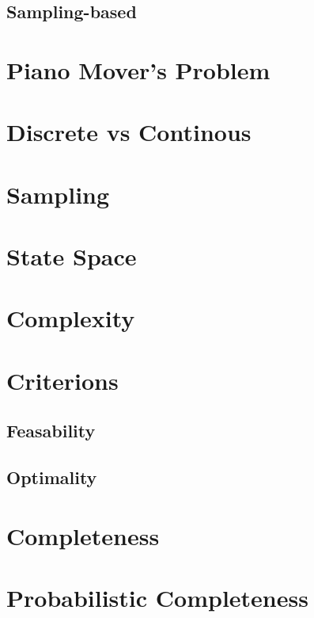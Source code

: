 \subsection{Sampling-based}
\label{subsec:samplingbased}









\section{Piano Mover's Problem}

\section{Discrete vs Continous}

\section{Sampling}

\section{State Space}

\section{Complexity}

\section{Criterions}

\subsection{Feasability}
\subsection{Optimality}

\section{Completeness}

\section{Probabilistic Completeness}

